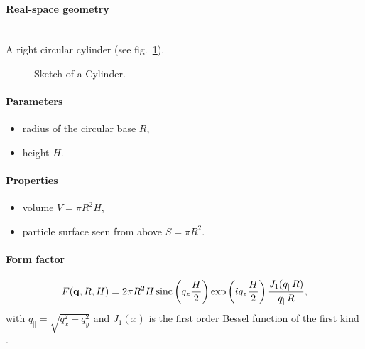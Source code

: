 \paragraph{Real-space geometry}\strut\\
A right circular cylinder (see fig.~\ref{fig:cylinder}).

\begin{figure}[ht]
\hfill
{}
\hfill
{}
\hfill
\caption{Sketch of a Cylinder.}
\label{fig:cylinder}
\end{figure}

\paragraph{Parameters}
\begin{itemize}
\item radius of the circular base $R$, 
\item height $H$.
\end{itemize}

\paragraph{Properties}
\begin{itemize}
\item volume $V = \pi R^2 H$,
\item particle surface seen from above $S=\pi R^2$.

\end{itemize}

\paragraph{Form factor}
  \begin{equation*}
F(\mathbf{q},R, H)=  2\pi
 R^2 H  \operatorname{sinc}\left(q_ z \frac{H}{2}\right) \exp\left(i q_ z \frac{H}{2}\right) \frac{J_1(q_{\parallel} R )}{q_{\parallel} R },
 \end{equation*}
with $q_{\parallel}=\sqrt{q_x^2+q_y^2}$ and $J_1(x)$ is the first order
Bessel function of the first kind \cite{AbSt64}.

